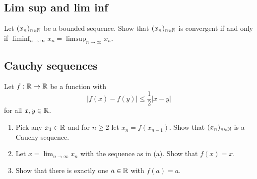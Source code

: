 \documentclass[10pt, a4paper]{article}
\newcommand{\seq}[2][x]{(#1_{#2})_{#2 \in \N}}
\begin{document}
\subsection{Lim sup and lim inf}

\begin{example}
    Let $(x_n)_{n \in \mathbb{N}}$ be a bounded sequence. Show that $(x_n)_{n \in \mathbb{N}}$ is convergent if and only if $\liminf_{n \rightarrow \infty} x_n = \limsup_{n \rightarrow \infty} x_n.$
\end{example}


\subsection{Cauchy sequences}

\begin{example}
    Let $f : \mathbb{R} \rightarrow \mathbb{R}$ be a function with
    \[
    |f(x) - f(y)| \leq \frac{1}{2}|x - y|
    \]
    for all $x, y \in \mathbb{R}$.
    \begin{enumerate}[label = \alph*.]
        \item Pick any $x_1 \in \mathbb{R}$ and for $n \geq 2$ let $x_n = f(x_{n - 1})$. Show that $\seq{n}$ is a Cauchy sequence.
        \item Let $x = \lim_{n \rightarrow \infty} x_n$ with the sequence as in (a). Show that $f(x) = x$.
        \item Show that there is exactly one $a \in \mathbb{R}$ with $f(a) = a$.
    \end{enumerate}


\end{example}
\end{document}
